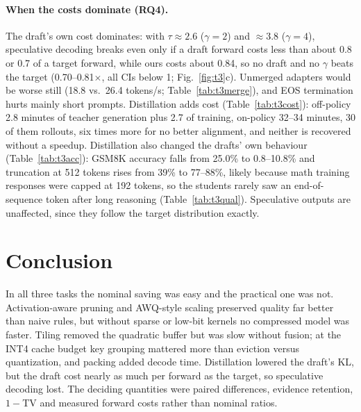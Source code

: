 \documentclass{article}
\begin{document}
\paragraph{When the costs dominate (RQ4).}
The draft's own cost dominates: with $\tau\approx2.6$ ($\gamma=2$) and $\approx3.8$ ($\gamma=4$), speculative decoding
breaks even only if a draft forward costs less than about 0.8 or 0.7 of a target forward, while ours costs about 0.84, so
no draft and no $\gamma$ beats the target (0.70--0.81$\times$, all CIs below 1; Fig.~\ref{fig:t3}c). Unmerged adapters
would be worse still (18.8 vs.\ 26.4 tokens/s; Table~\ref{tab:t3merge}), and EOS termination hurts mainly short prompts.
Distillation adds cost (Table~\ref{tab:t3cost}): off-policy 2.8 minutes of teacher generation plus 2.7 of
training, on-policy 32--34 minutes, 30 of them rollouts, six times more for no better alignment, and neither is recovered
without a speedup. Distillation also changed
the drafts' own behaviour (Table~\ref{tab:t3acc}): GSM8K accuracy falls from 25.0\% to 0.8--10.8\% and truncation at 512
tokens rises from 39\% to 77--88\%, likely because math training responses were capped at 192 tokens, so the students
rarely saw an end-of-sequence token after long reasoning (Table~\ref{tab:t3qual}). Speculative outputs are unaffected,
since they follow the target distribution exactly.

\section{Conclusion}
\label{sec:conclusion}
In all three tasks the nominal saving was easy and the practical one was not. Activation-aware pruning and AWQ-style
scaling preserved quality far better than naive rules, but without sparse or low-bit kernels no compressed model was
faster. Tiling removed the quadratic buffer but was slow without fusion; at the INT4 cache budget key grouping mattered
more than eviction versus quantization, and packing added decode time. Distillation lowered the draft's KL, but the draft
cost nearly as much per forward as the target, so speculative decoding lost. The deciding quantities were paired
differences, evidence retention, $1-$TV and measured forward costs rather than nominal ratios.
\end{document}
